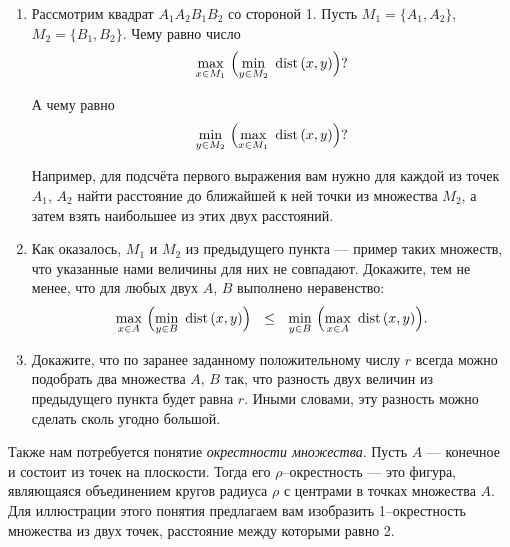 \vspace{-0.2cm}
\begin{enumerate}

\item Рассмотрим квадрат $A_1A_2B_1B_2$ со стороной 1. Пусть $M_1 = \{A_1, A_2\}$, $M_2 = \{B_1, B_2\}$. Чему равно число
\vspace{-0.2cm}
$$\max\l{x \in M_1}\ \Bigl(\min\l{y \in M_2}\ \dist (x,y)\Bigr)?$$

\vspace{-0.2cm}
А чему равно
\vspace{-0.2cm}
$$\min\l{y \in M_2}\ \Bigl(\max\l{x \in M_1}\ \dist (x,y)\Bigr)?$$

\vspace{-0.2cm}
Например, для подсчёта первого выражения вам нужно для каждой из точек $A_1$, $A_2$ найти расстояние до ближайшей к ней точки из множества $M_2$, а затем взять наибольшее из этих двух расстояний.

\item Как оказалось, $M_1$ и $M_2$ из предыдущего пункта — пример таких множеств, что указанные нами величины для них не совпадают. Докажите, тем не менее, что для любых двух $A$, $B$ выполнено неравенство:
\vspace{-0.2cm}
$$\max\l{x \in A}\ \Bigl(\min\l{y \in B}\ \dist (x,y)\Bigr)\ \ \le\ \ 
	\min\l{y \in B}\ \Bigl(\max\l{x \in A}\ \dist (x,y)\Bigr).$$

\vspace{-0.45cm}
\item Докажите, что по заранее заданному положительному числу $r$ всегда можно подобрать два множества $A$, $B$ так, что разность двух величин из предыдущего пункта будет равна $r$. Иными словами, эту разность можно сделать сколь угодно большой.

\end{enumerate}

\noindent Также нам потребуется понятие {\itshape окрестности множества}. Пусть $A$ — конечное и состоит из точек на плоскости. Тогда его $\rho$--окрестность — это фигура, являющаяся объединением кругов радиуса $\rho$ с центрами в точках множества $A$. Для иллюстрации этого понятия предлагаем вам изобразить 1--окрестность множества из двух точек, расстояние между которыми равно 2.

